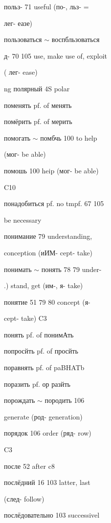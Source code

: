 \begin{minipage}[t]{0.475\textwidth}
\raggedright
\noindent польз- 71 useful (по-, льз- =\par
\noindent лег- еазе)\par
\noindent пользоваться $\sim$ воспбльзоваться\par
\noindent д- 70 105 use, make use of, exploit\par
\noindent ( лег- ease)\par
\noindent ng полярный 4S polar\par
\noindent поменять pf. of менять\par
\noindent помёрить pf. of мерить\par
\noindent помогать $\sim$ помбчь 100 to help\par
\noindent (мог- be able)\par
{} помошь 100 heip (мог- be able)\par
\noindent C10\par
\noindent понадобиться pf. no tmpf. 67 105\par
\noindent be necessary\par
\noindent понимание 79 understanding,\par
\noindent conception (иИМ- cept- take)\par
\noindent понимать $\sim$ понять 78 79 under-\par
\noindent .) stand, get (им-, я- take)\par
\noindent понятие 51 79 80 concept (я-\par
\noindent cept- take) C3\par
\noindent понять pf. of понимАть\par
\noindent попросйть pf. of просйть\par
{}\par
\noindent поравнять pf. of paBHATb\par
\noindent поразить pf. ор разйть\par
\noindent порождать $\sim$ породить 106\par
\noindent generate (род- generation)\par
\noindent порядок 106 order (ряд- row)\par
\noindent C3\par
\noindent после 52 after c8\par
\noindent послёдний 16 103 latter, last\par
\noindent (след- follow)\par
\noindent послёдовательно 103 successivel\par

\end{minipage}
